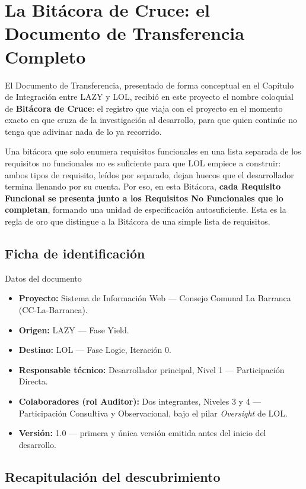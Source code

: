 \documentclass[14pt,a4paper,oneside]{extbook}
\begin{document}
\section{La Bitácora de Cruce: el Documento de Transferencia Completo}

El Documento de Transferencia, presentado de forma conceptual en el Capítulo de Integración entre LAZY y LOL, recibió en este proyecto el nombre coloquial de \textbf{Bitácora de Cruce}: el registro que viaja con el proyecto en el momento exacto en que cruza de la investigación al desarrollo, para que quien continúe no tenga que adivinar nada de lo ya recorrido.

Una bitácora que solo enumera requisitos funcionales en una lista separada de los requisitos no funcionales no es suficiente para que LOL empiece a construir: ambos tipos de requisito, leídos por separado, dejan huecos que el desarrollador termina llenando por su cuenta. Por eso, en esta Bitácora, \textbf{cada Requisito Funcional se presenta junto a los Requisitos No Funcionales que lo completan}, formando una unidad de especificación autosuficiente. Esta es la regla de oro que distingue a la Bitácora de una simple lista de requisitos.

\subsection{Ficha de identificación}

\begin{bitacorafield}{Datos del documento}
\begin{itemize}
\item \textbf{Proyecto:} Sistema de Información Web — Consejo Comunal La Barranca (CC-La-Barranca).
\item \textbf{Origen:} LAZY — Fase Yield.
\item \textbf{Destino:} LOL — Fase Logic, Iteración 0.
\item \textbf{Responsable técnico:} Desarrollador principal, Nivel 1 — Participación Directa.
\item \textbf{Colaboradores (rol Auditor):} Dos integrantes, Niveles 3 y 4 — Participación Consultiva y Observacional, bajo el pilar \textit{Oversight} de LOL.
\item \textbf{Versión:} 1.0 — primera y única versión emitida antes del inicio del desarrollo.
\end{itemize}
\end{bitacorafield}

\subsection{Recapitulación del descubrimiento}
\end{document}
